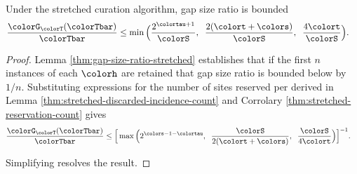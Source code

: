 \begin{theorem}
\label{thm:stretched-gap-size}
Under the stretched curation algorithm, gap size ratio is bounded
\begin{align*}
\frac{\colorG_{\colorT}(\colorTbar)}{\colorTbar}
&\leq
\min\Big(
  \frac{2^{\colortau+1}}{\colorS},\;\;
  \frac{2(\colort + \colors)}{\colorS},\;\;
  \frac{4\colort}{\colorS}
\Big).
\end{align*}
\end{theorem}
\begin{proof}

Lemma \ref{thm:gap-size-ratio-stretched} establishes that if the first $n$ instances of each \hv{} $\colorh$ are retained that gap size ratio is bounded below by $1/n$.
Substituting expressions for the number of sites reserved per \hv{} derived in Lemma \ref{thm:stretched-discarded-incidence-count} and Corrolary \ref{thm:stretched-reservation-count} gives
\begin{align*}
  \frac{\colorG_{\colorT}(\colorTbar)}{\colorTbar}
  &\leq
  \Big[
    \max\Big(
      2^{\colors - 1 - \colortau},\;\;
      \frac{\colorS}{2(\colort + \colors)},\;\;
      \frac{\colorS}{4\colort}
    \Big)
  \Big]^{-1}.
\end{align*}

Simplifying resolves the result.

\end{proof}
